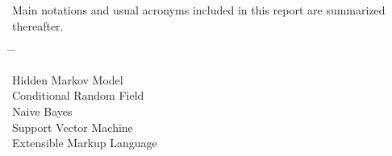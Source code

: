 Main notations and usual acronyms included in this report are summarized thereafter. \\

\begin{tabbing}
\hspace{3cm} \= \hspace{3cm} \= \kill

 \> Hidden Markov Model\\
 \> Conditional Random Field\\
	\> Naive Bayes\\
 \> Support Vector Machine\\
 \> Extensible Markup Language\\
\end{tabbing}




